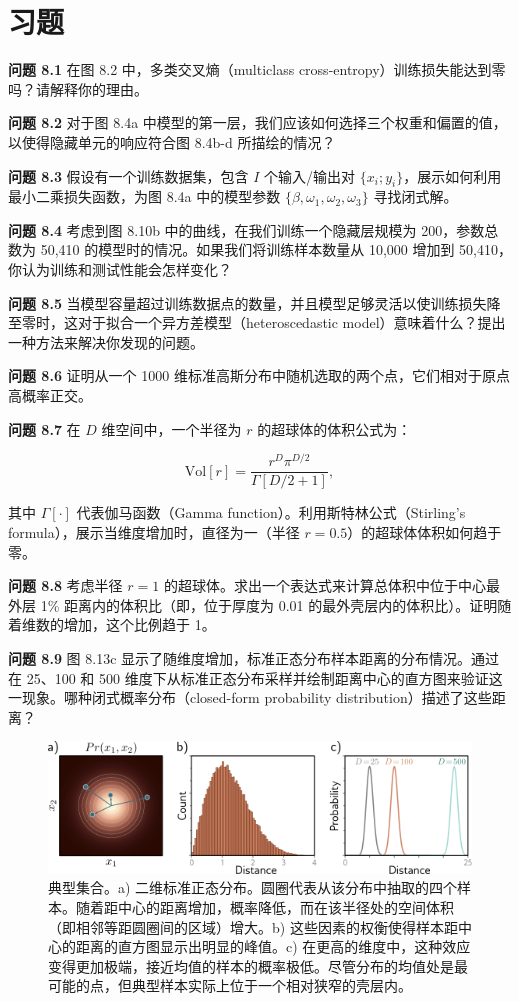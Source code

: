 \section{习题}
\textbf{问题 8.1} 在图 8.2 中，多类交叉熵（multiclass cross-entropy）训练损失能达到零吗？请解释你的理由。

\textbf{问题 8.2} 对于图 8.4a 中模型的第一层，我们应该如何选择三个权重和偏置的值，以使得隐藏单元的响应符合图 8.4b-d 所描绘的情况？

\textbf{问题 8.3} 假设有一个训练数据集，包含 \( I \) 个输入/输出对 \( \{x_i; y_i\} \)，展示如何利用最小二乘损失函数，为图 8.4a 中的模型参数 \( \{\beta, \omega_1, \omega_2, \omega_3\} \) 寻找闭式解。

\textbf{问题 8.4} 考虑到图 8.10b 中的曲线，在我们训练一个隐藏层规模为 200，参数总数为 50,410 的模型时的情况。如果我们将训练样本数量从 10,000 增加到 50,410，你认为训练和测试性能会怎样变化？

\textbf{问题 8.5} 当模型容量超过训练数据点的数量，并且模型足够灵活以使训练损失降至零时，这对于拟合一个异方差模型（heteroscedastic model）意味着什么？提出一种方法来解决你发现的问题。

\textbf{问题 8.6} 证明从一个 1000 维标准高斯分布中随机选取的两个点，它们相对于原点高概率正交。

\textbf{问题 8.7} 在 \( D \) 维空间中，一个半径为 \( r \) 的超球体的体积公式为：

\begin{equation}
\text{Vol}[r] = \frac{r^D \pi^{D/2}}{\Gamma[D/2 + 1]}, 
\end{equation}

其中 \( \Gamma[\cdot] \) 代表伽马函数（Gamma function）。利用斯特林公式（Stirling's formula），展示当维度增加时，直径为一（半径 \( r=0.5 \)）的超球体体积如何趋于零。

\textbf{问题 8.8} 考虑半径 \( r = 1 \) 的超球体。求出一个表达式来计算总体积中位于中心最外层 1\% 距离内的体积比（即，位于厚度为 0.01 的最外壳层内的体积比）。证明随着维数的增加，这个比例趋于 1。

\textbf{问题 8.9} 图 8.13c 显示了随维度增加，标准正态分布样本距离的分布情况。通过在 25、100 和 500 维度下从标准正态分布采样并绘制距离中心的直方图来验证这一现象。哪种闭式概率分布（closed-form probability distribution）描述了这些距离？

\begin{figure}[ht!]
\centering
\includegraphics[width=0.7\linewidth]{png/chapter8/PerfTypical.png}
\caption{典型集合。a) 二维标准正态分布。圆圈代表从该分布中抽取的四个样本。随着距中心的距离增加，概率降低，而在该半径处的空间体积（即相邻等距圆圈间的区域）增大。b) 这些因素的权衡使得样本距中心的距离的直方图显示出明显的峰值。c) 在更高的维度中，这种效应变得更加极端，接近均值的样本的概率极低。尽管分布的均值处是最可能的点，但典型样本实际上位于一个相对狭窄的壳层内。}
\end{figure}

